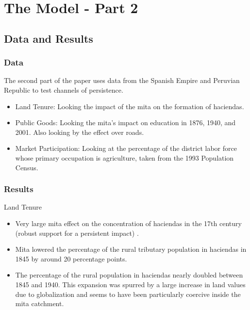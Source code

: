 \section{The Model - Part 2}
\subsection{Data and Results}



\begin{frame}
\frametitle{Data}
The second part of the paper uses data from the Spanish Empire and Peruvian Republic to test channels of persistence. 
\begin{itemize}
    \item Land Tenure: Looking the impact of the mita on the formation of haciendas.\\[10pt]
    
    \item Public Goods: Looking the mita’s impact on education in 1876, 1940, and 2001. Also looking by the effect over roads.\\[10pt]
    
    \item Market Participation: Looking at the percentage of the district labor force whose primary occupation is agriculture, taken from the 1993 Population Census.\\[10pt]
    
\end{itemize}



\end{frame}

\begin{frame}
\frametitle{Results}

Land Tenure
\begin{itemize}
    \item Very large mita effect on the concentration of haciendas in the 17th century (robust support for a persistent impact) .\\[10pt]
    
    \item Mita lowered the percentage of the rural tributary population in haciendas in 1845 by around 20 percentage points.\\[10pt]
    
    \item  The percentage of the rural population in haciendas nearly doubled between 1845 and 1940. This expansion was spurred by a large increase in land values due to globalization and seems to have been particularly coercive inside the mita catchment.
\end{itemize}

\end{frame}


